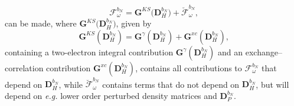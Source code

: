 \documentclass[%
 reprint,
 amsmath,amssymb,
 aps,
]{revtex4-1}
\begin{document}
\begin{equation}\label{fbomega}
\bm{\mathcal{F}}^{b_{N}}_{\omega} = \mathbf{G}^{KS} \bigl( \mathbf{D}_{H}^{b_{N}} \bigr)  + 
\breve{\bm{\mathcal{F}}}^{b_{N}}_{\omega}\text{,}
\end{equation}
can be made, where $\mathbf{G}^{KS} \bigl( \mathbf{D}_{H}^{b_{N}} \bigr)$, given by
\begin{equation}\label{GKSbc}
\mathbf{G}^{KS}(\mathbf{D}^{b_{N}}_{H}) = \mathbf{G}^{\gamma}(\mathbf{D}^{b_{N}}_{H}) + \mathbf{G}^{xc}(\mathbf{D}^{b_{N}}_{H})\text{,}
\end{equation}
containing a two-electron integral contribution $\mathbf{G}^{\gamma}(\mathbf{D}^{b_{N}}_{H})$ and an exchange--correlation contribution $\mathbf{G}^{xc}(\mathbf{D}^{b_{N}}_{H})$, contains all contributions to $\bm{\mathcal{F}}^{b_{N}}_{\omega} $ that depend on $\mathbf{D}^{b_{N}}_{H}$, while $\breve{\bm{\mathcal{F}}}^{b_{N}}_{\omega}$ contains terms that do not depend on $\mathbf{D}^{b_{N}}_{H}$, but will depend on \textit{e.g.} lower order perturbed density matrices and $\mathbf{D}^{b_N}_P$. 
\end{document}
